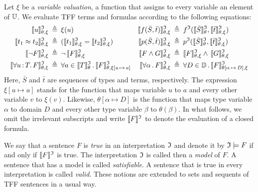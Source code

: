 Let $\xi$ be a {\em variable valuation}, a function that assigns
to every variable an element of $\mathbb{U}$. We evaluate TFF terms
and formulas according to the following equations:
\begin{align*}
\eval{u} &\eqdef \xi(u) &
\eval{f(\bar{S},\bar{t})} &\eqdef f^\cI(\evalT{\bar{S}},\eval{\bar{t}}) \\
\eval{t_1 \approx t_2} &\eqdef (\eval{t_1} = \eval{t_2}) &
\eval{p(\bar{S},\bar{t})} &\eqdef p^\cI(\evalT{\bar{S}},\eval{\bar{t}}) \\
\eval{\lnot F} &\eqdef \lnot\, \eval{F} &
\eval{F \land G} &\eqdef \eval{F} \land\, \eval{G} \\
\eval{\forall u \ty T .\, F} &\eqdef \forall {a \in \evalT{T}} \,.\,
\evalG{F}_{\theta,\xi[u\,\mapsto\,a]} &
\eval{\forall \alpha \,.\, F} &\eqdef \forall {D \in \sorts} \,.\,
\evalG{F}_{\theta[\alpha\,\mapsto\,D],\xi} %
\end{align*}
Here, $\bar{S}$ and $\bar{t}$ are sequences of types and terms, respectively.
The expression $\xi[u \mapsto a]$ stands for the function that
maps variable $u$ to $a$ and every other variable $v$ to $\xi(v)$.
Likewise, $\theta[\alpha \mapsto D]$ is the function that maps
type variable $\alpha$ to domain $D$ and every other type
variable $\beta$ to $\theta(\beta)$. In what follows,
we omit the irrelevant subscripts and write $\llbracket F\rrbracket^{\mathfrak{I}}$
to denote the evaluation of a closed formula.

We say that a sentence $F$ is {\em true} in an interpretation $\mathfrak{I}$
and denote it by $\mathfrak{I} \models F$ if and only if $\llbracket F\rrbracket^{\mathfrak{I}}$ is true.
The interpretation $\mathfrak{I}$ is called then a {\em model\/} of $F$.
A sentence that has a model is called {\em satisfiable}.
A sentence that is true in every interpretation is called {\em valid}.
These notions are extended to sets and sequents of TFF sentences in
a usual way.

